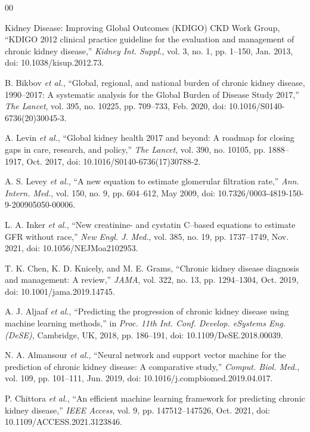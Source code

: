 \documentclass[conference]{IEEEtran}
\begin{document}
{\scriptsize
\begin{thebibliography}{00}
\setlength{\itemsep}{0.5pt plus 0.1pt minus 0.1pt}

Kidney Disease: Improving Global Outcomes (KDIGO) CKD Work Group, ``KDIGO 2012 clinical practice guideline for the evaluation and management of chronic kidney disease,'' \emph{Kidney Int. Suppl.}, vol. 3, no. 1, pp. 1--150, Jan. 2013, doi: 10.1038/kisup.2012.73.

B. Bikbov \emph{et al.}, ``Global, regional, and national burden of chronic kidney disease, 1990--2017: A systematic analysis for the Global Burden of Disease Study 2017,'' \emph{The Lancet}, vol. 395, no. 10225, pp. 709--733, Feb. 2020, doi: 10.1016/S0140-6736(20)30045-3.

A. Levin \emph{et al.}, ``Global kidney health 2017 and beyond: A roadmap for closing gaps in care, research, and policy,'' \emph{The Lancet}, vol. 390, no. 10105, pp. 1888--1917, Oct. 2017, doi: 10.1016/S0140-6736(17)30788-2.

A. S. Levey \emph{et al.}, ``A new equation to estimate glomerular filtration rate,'' \emph{Ann. Intern. Med.}, vol. 150, no. 9, pp. 604--612, May 2009, doi: 10.7326/0003-4819-150-9-200905050-00006.

L. A. Inker \emph{et al.}, ``New creatinine- and cystatin C--based equations to estimate GFR without race,'' \emph{New Engl. J. Med.}, vol. 385, no. 19, pp. 1737--1749, Nov. 2021, doi: 10.1056/NEJMoa2102953.

T. K. Chen, K. D. Knicely, and M. E. Grams, ``Chronic kidney disease diagnosis and management: A review,'' \emph{JAMA}, vol. 322, no. 13, pp. 1294--1304, Oct. 2019, doi: 10.1001/jama.2019.14745.

A. J. Aljaaf \emph{et al.}, ``Predicting the progression of chronic kidney disease using machine learning methods,'' in \emph{Proc. 11th Int. Conf. Develop. eSystems Eng. (DeSE)}, Cambridge, UK, 2018, pp. 186--191, doi: 10.1109/DeSE.2018.00039.

N. A. Almansour \emph{et al.}, ``Neural network and support vector machine for the prediction of chronic kidney disease: A comparative study,'' \emph{Comput. Biol. Med.}, vol. 109, pp. 101--111, Jun. 2019, doi: 10.1016/j.compbiomed.2019.04.017.

P. Chittora \emph{et al.}, ``An efficient machine learning framework for predicting chronic kidney disease,'' \emph{IEEE Access}, vol. 9, pp. 147512--147526, Oct. 2021, doi: 10.1109/ACCESS.2021.3123846.


\end{thebibliography}}
\end{document}
